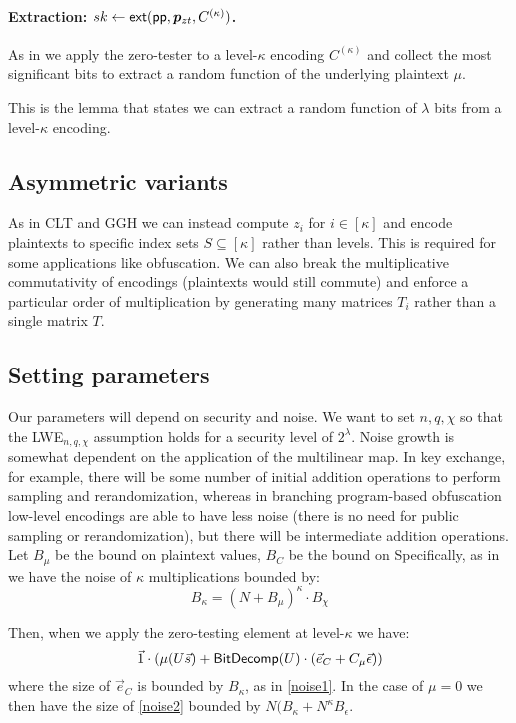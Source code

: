 \paragraph{Extraction: $sk \leftarrow \mathsf{ext}(\mathsf{pp}, \bm{p}_{zt}, C^{(\kappa)})$.}  As in \cite{ggh13a, clt15} we apply the zero-tester to a level-$\kappa$ encoding $C^{(\kappa)}$ and collect the most significant bits to extract a random function of the underlying plaintext $\mu$.

\begin{lemma}
\label{extraction}
This is the lemma that states we can extract a random function of $\lambda$ bits from a level-$\kappa$ encoding.
\end{lemma}

\subsection{Asymmetric variants}

As in CLT and GGH we can instead compute $z_i$ for $i \in [\kappa]$ and encode plaintexts to specific index sets $S \subseteq [\kappa]$ rather than levels.  This is required for some applications like obfuscation.  We can also break the multiplicative commutativity of encodings (plaintexts would still commute) and enforce a particular order of multiplication by generating many matrices $T_i$ rather than a single matrix $T$.

\subsection{Setting parameters}

Our parameters will depend on security and noise.  We want to set $n,q,\chi$ so that the LWE$_{n,q,\chi}$ assumption holds for a security level of $2^\lambda$.  Noise growth is somewhat dependent on the application of the multilinear map.  In key exchange, for example, there will be some number of initial addition operations to perform sampling and rerandomization, whereas in branching program-based obfuscation low-level encodings are able to have less noise (there is no need for public sampling or rerandomization), but there will be intermediate addition operations.  Let $B_\mu$ be the bound on plaintext values, $B_C$ be the bound on Specifically, as in \cite{gsw} we have the noise of $\kappa$ multiplications  bounded by:
\begin{equation}
\label{noise1}
B_\kappa = (N + B_\mu)^\kappa \cdot B_\chi
\end{equation}

Then, when we apply the zero-testing element at level-$\kappa$ we have:
\begin{equation}
\label{noise2}
\vec{1}\cdot(\mu(U \vec{s}) + \mathsf{BitDecomp}(U)\cdot (\vec{e}_C + C_\mu\vec{\epsilon}))\\
\end{equation}
where the size of $\vec{e}_C$ is bounded by $B_\kappa$, as in \eqref{noise1}.  In the case of $\mu = 0$ we then have the size of \eqref{noise2} bounded by $N(B_\kappa + N^\kappa B_\epsilon$.



